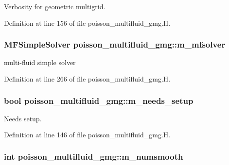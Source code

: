 Verbosity for geometric multigrid. 



Definition at line 156 of file poisson\+\_\+multifluid\+\_\+gmg.\+H.

\subsubsection[{\texorpdfstring{m\+\_\+mfsolver}{m_mfsolver}}]{\setlength{\rightskip}{0pt plus 5cm}M\+F\+Simple\+Solver poisson\+\_\+multifluid\+\_\+gmg\+::m\+\_\+mfsolver\hspace{0.3cm}{\ttfamily [protected]}}\hypertarget{classpoisson__multifluid__gmg_a83739ab34f2b38ec4d7a60d20399322b}{}\label{classpoisson__multifluid__gmg_a83739ab34f2b38ec4d7a60d20399322b}


multi-\/fluid simple solver 



Definition at line 266 of file poisson\+\_\+multifluid\+\_\+gmg.\+H.

\subsubsection[{\texorpdfstring{m\+\_\+needs\+\_\+setup}{m_needs_setup}}]{\setlength{\rightskip}{0pt plus 5cm}bool poisson\+\_\+multifluid\+\_\+gmg\+::m\+\_\+needs\+\_\+setup\hspace{0.3cm}{\ttfamily [protected]}}\hypertarget{classpoisson__multifluid__gmg_add2121a6f35babe105bac8f95feec753}{}\label{classpoisson__multifluid__gmg_add2121a6f35babe105bac8f95feec753}


Needs setup. 



Definition at line 146 of file poisson\+\_\+multifluid\+\_\+gmg.\+H.

\subsubsection[{\texorpdfstring{m\+\_\+numsmooth}{m_numsmooth}}]{\setlength{\rightskip}{0pt plus 5cm}int poisson\+\_\+multifluid\+\_\+gmg\+::m\+\_\+numsmooth\hspace{0.3cm}{\ttfamily [protected]}}\hypertarget{classpoisson__multifluid__gmg_ab50737e41af7f1f7de3646530ca7ea24}{}\label{classpoisson__multifluid__gmg_ab50737e41af7f1f7de3646530ca7ea24}


